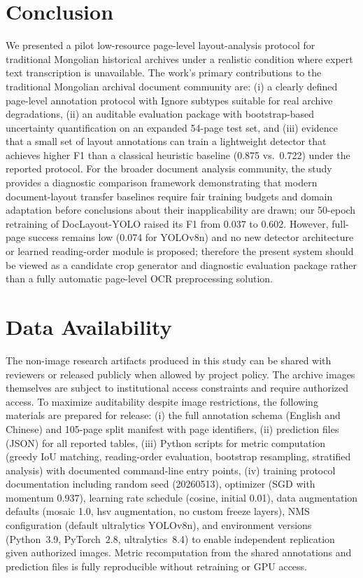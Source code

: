 \documentclass[pdflatex,sn-mathphys-num]{sn-jnl}
\begin{document}
\section{Conclusion}
We presented a pilot low-resource page-level layout-analysis protocol for traditional Mongolian historical archives under a realistic condition where expert text transcription is unavailable. The work's primary contributions to the traditional Mongolian archival document community are: (i) a clearly defined page-level annotation protocol with Ignore subtypes suitable for real archive degradations, (ii) an auditable evaluation package with bootstrap-based uncertainty quantification on an expanded 54-page test set, and (iii) evidence that a small set of layout annotations can train a lightweight detector that achieves higher F1 than a classical heuristic baseline (0.875 vs.~0.722) under the reported protocol. For the broader document analysis community, the study provides a diagnostic comparison framework demonstrating that modern document-layout transfer baselines require fair training budgets and domain adaptation before conclusions about their inapplicability are drawn; our 50-epoch retraining of DocLayout-YOLO raised its F1 from 0.037 to 0.602. However, full-page success remains low (0.074 for YOLOv8n) and no new detector architecture or learned reading-order module is proposed; therefore the present system should be viewed as a candidate crop generator and diagnostic evaluation package rather than a fully automatic page-level OCR preprocessing solution.


\section*{Data Availability}
The non-image research artifacts produced in this study can be shared with reviewers or released publicly when allowed by project policy. The archive images themselves are subject to institutional access constraints and require authorized access. To maximize auditability despite image restrictions, the following materials are prepared for release: (i) the full annotation schema (English and Chinese) and 105-page split manifest with page identifiers, (ii) prediction files (JSON) for all reported tables, (iii) Python scripts for metric computation (greedy IoU matching, reading-order evaluation, bootstrap resampling, stratified analysis) with documented command-line entry points, (iv) training protocol documentation including random seed (20260513), optimizer (SGD with momentum 0.937), learning rate schedule (cosine, initial 0.01), data augmentation defaults (mosaic 1.0, hsv augmentation, no custom freeze layers), NMS configuration (default ultralytics YOLOv8n), and environment versions (Python~3.9, PyTorch~2.8, ultralytics~8.4) to enable independent replication given authorized images. Metric recomputation from the shared annotations and prediction files is fully reproducible without retraining or GPU access.
\end{document}
